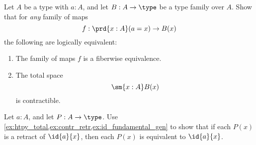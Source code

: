 \begin{exercises}
\item \label{ex:id_fundamental_gen}Let $A$ be a type with $a:A$, and let $B:A\to\type$ be a type family over $A$. Show that for \emph{any} family of maps
\begin{equation*}
f:\prd{x:A} (a=x)\to B(x)
\end{equation*}
the following are logically equivalent:
\begin{enumerate}
\item The family of maps $f$ is a fiberwise equivalence.
\item The total space
\begin{equation*}
\sm{x:A}B(x)
\end{equation*}
is contractible.
\end{enumerate}
\item Let $a:A$, and let $P:A\to \type$. Use \autoref{ex:htpy_total,ex:contr_retr,ex:id_fundamental_gen} to show that if each $P(x)$ is a retract of $\id{a}{x}$, then each $P(x)$ is equivalent to $\id{a}{x}$. 
\end{exercises}
